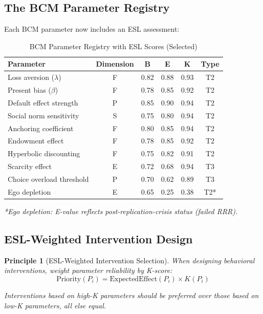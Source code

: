 \documentclass[11pt,a4paper]{article}
\newtheorem{principle}{Principle}[section]
\theoremstyle{remark}
\begin{document}
\subsection{The BCM Parameter Registry}

Each BCM parameter now includes an ESL assessment:

\begin{table}[h]
\centering
\caption{BCM Parameter Registry with ESL Scores (Selected)}
\label{tab:bcm-registry}
\begin{tabular}{p{4cm}ccccc}
\toprule
\textbf{Parameter} & \textbf{Dimension} & \textbf{B} & \textbf{E} & \textbf{K} & \textbf{Type} \\
\midrule
Loss aversion ($\lambda$) & F & 0.82 & 0.88 & 0.93 & T2 \\
Present bias ($\beta$) & F & 0.78 & 0.85 & 0.92 & T2 \\
Default effect strength & P & 0.85 & 0.90 & 0.94 & T2 \\
Social norm sensitivity & S & 0.75 & 0.80 & 0.94 & T2 \\
Anchoring coefficient & F & 0.80 & 0.85 & 0.94 & T2 \\
Endowment effect & F & 0.78 & 0.85 & 0.92 & T2 \\
Hyperbolic discounting & F & 0.75 & 0.82 & 0.91 & T2 \\
Scarcity effect & E & 0.72 & 0.68 & 0.94 & T3 \\
Choice overload threshold & P & 0.70 & 0.62 & 0.89 & T3 \\
Ego depletion & E & 0.65 & 0.25 & 0.38 & T2* \\
\bottomrule
\end{tabular}
\end{table}

\textit{*Ego depletion: E-value reflects post-replication-crisis status (failed RRR).}

\subsection{ESL-Weighted Intervention Design}

\begin{principle}[ESL-Weighted Intervention Selection]
\label{princ:weighted-intervention}
When designing behavioral interventions, weight parameter reliability by K-score:
\begin{equation}
\text{Priority}(P_i) = \text{ExpectedEffect}(P_i) \times K(P_i)
\end{equation}

Interventions based on high-K parameters should be preferred over those based on low-K parameters, all else equal.
\end{principle}
\end{document}
